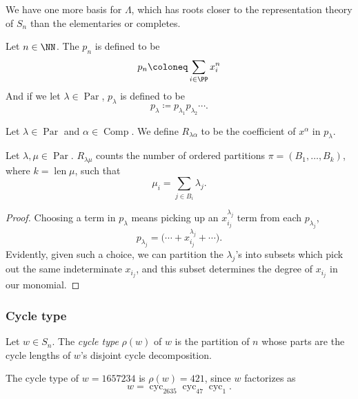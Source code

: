 \documentclass{article}
\DeclareMathOperator{\len}{len}
\DeclareMathOperator{\Par}{Par}
\DeclareMathOperator{\Com}{Comp}
\DeclareMathOperator{\cyc}{cyc}
\begin{document}
We have one more basis for $\Lambda$, which has roots closer to the representation theory of $S_n$ than the elementaries or completes.

\begin{definition}
    Let $n\in\NN$. The  $p_n$ is defined to be
    \[
        p_n 
        \coloneq 
        \sum_{i\in\PP} x_i^n
    \]
    And if we let $\lambda \in \Par$, $p_\lambda$ is defined to be
    \[
        p_\lambda 
        \coloneq 
        p_{\lambda_1}p_{\lambda_2}\cdots.
    \]
\end{definition}

\begin{definition}
    Let $\lambda \in \Par$ and $\alpha \in \Com$.
    We define $R_{\lambda\alpha}$ to be the coefficient of $x^\alpha$ in $p_\lambda$.
\end{definition}

\begin{theorem}
    Let $\lambda, \mu \in \Par$.
    $R_{\lambda\mu}$ counts the number of ordered partitions $\pi = (B_1, \ldots, B_k)$, where $k = \len \mu$, such that
    \[
        \mu_i = \sum_{j\in B_i} \lambda_j.
    \]
\end{theorem}

\begin{proof}
    Choosing a term in $p_\lambda$ means picking up an $x_{i_j}^{\lambda_j}$ term from each $p_{\lambda_j}$,
    \[
        p_{\lambda_j} = \Big(\cdots + x_{i_j}^{\lambda_j} + \cdots\Big).
    \]
    Evidently, given such a choice, we can partition the $\lambda_j$'s into subsets which pick out the same indeterminate $x_{i_j}$, and this subset determines the degree of $x_{i_j}$ in our monomial.
\end{proof}

\subsubsection{Cycle type}

\begin{definition}
    Let $w \in S_n$. The \textit{cycle type} $\rho(w)$ of $w$ is the partition of $n$ whose parts are the cycle lengths of $w$'s disjoint cycle decomposition.
\end{definition}

\begin{example}
    The cycle type of $w = 1657234$ is $\rho(w) = 421$, since $w$ factorizes as
    \[
        w = \cyc_{2635}\cyc_{47}\cyc_{1}.
    \]
\end{example}
\end{document}
